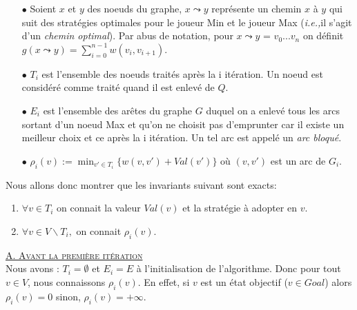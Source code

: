 \begin{itemize}
	\item[$\bullet$] Soient $x$ et $y$ des noeuds du graphe, $x \leadsto y$ représente un chemin $x$ à $y$ qui suit des stratégies optimales pour le joueur Min et le joueur Max (\emph{i.e.,}il s'agit d'un \emph{chemin optimal}). Par abus de notation, pour $x \leadsto y$ = $v_0 ...v_n$ on définit $g(x \leadsto y) = \sum_{i=0}^{n-1} w(v_i, v_{i+1})$.
	\item[$\bullet$] $T_{i}$ est l'ensemble des noeuds traités après la i itération. Un noeud est considéré comme traité quand il est enlevé de $Q$.
	\item[$\bullet$] $E_i$ est l'ensemble des arêtes du graphe $G$ duquel on a enlevé tous les arcs sortant d'un noeud Max et qu'on ne choisit pas d'emprunter car il existe un meilleur choix et ce après la i itération. Un tel arc est appelé un \emph{arc bloqué}.
	\item[$\bullet$] $\rho_i(v) := \min _{v' \in T_i}\{ w(v,v') + Val(v') \} $ où $(v,v')$ est un arc de $G_i$.
\end{itemize}

$\text{}$\\
\noindent Nous allons donc montrer que les invariants suivant sont exacts: 

\begin{enumerate}
	\item $\forall v \in T_i$ on connait la valeur $Val(v)$ et la stratégie à adopter en $v$.
	\item $\forall v \in V \backslash T_i,$ on connait $\rho_i(v)$.
\end{enumerate}
	
\noindent \underline{\textsc{A. Avant la première itération}}\\

Nous avons : $T_i = \emptyset$ et $E_i = E$ à l'initialisation de l'algorithme. Donc pour tout $v \in V$, nous connaissons $\rho_i(v)$. En effet, si $v$ est un état objectif ($v \in Goal$) alors $\rho_i(v) = 0$ sinon, $\rho_i(v) = + \infty$.\\

